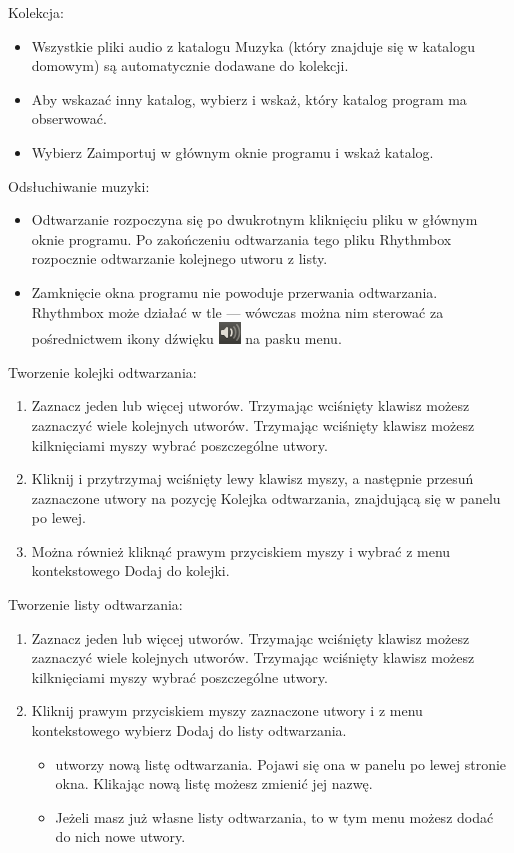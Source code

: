 Kolekcja:
\begin{itemize}
\item Wszystkie pliki audio z katalogu Muzyka (który znajduje się w katalogu domowym) są automatycznie dodawane do kolekcji.
\item Aby wskazać inny katalog, wybierz  i wskaż, który katalog program ma obserwować.
\item Wybierz \textcolor{ubuntu_orange}{Zaimportuj} w głównym oknie programu i wskaż katalog.
\end{itemize}
Odsłuchiwanie muzyki:
\begin{itemize}
\item Odtwarzanie rozpoczyna się po dwukrotnym kliknięciu pliku w głównym oknie programu. Po zakończeniu odtwarzania tego pliku Rhythmbox rozpocznie odtwarzanie kolejnego utworu z listy.
\item Zamknięcie okna programu nie powoduje przerwania odtwarzania. Rhythmbox może działać w tle --- wówczas można nim sterować za pośrednictwem ikony dźwięku \includegraphics{images/ikony_dzwiek.png} na pasku menu.
\end{itemize}
Tworzenie kolejki odtwarzania:
\begin{enumerate}
\item Zaznacz jeden lub więcej utworów. Trzymając wciśnięty klawisz  możesz zaznaczyć wiele kolejnych utworów. Trzymając wciśnięty klawisz  możesz kilknięciami myszy wybrać poszczególne utwory.
\item Kliknij i przytrzymaj wciśnięty lewy klawisz myszy, a następnie przesuń zaznaczone utwory na pozycję \textcolor{ubuntu_orange}{Kolejka odtwarzania}, znajdującą się w panelu po lewej.
\item Można również kliknąć prawym przyciskiem myszy i wybrać z menu kontekstowego \textcolor{ubuntu_orange}{Dodaj do kolejki}.
\end{enumerate}
Tworzenie listy odtwarzania:
\begin{enumerate}
\item Zaznacz jeden lub więcej utworów. Trzymając wciśnięty klawisz  możesz zaznaczyć wiele kolejnych utworów. Trzymając wciśnięty klawisz  możesz kilknięciami myszy wybrać poszczególne utwory.
\item  Kliknij prawym przyciskiem myszy zaznaczone utwory i z menu kontekstowego wybierz \textcolor{ubuntu_orange}{Dodaj do listy odtwarzania}.
\begin{itemize}
\item {} utworzy nową listę odtwarzania. Pojawi się ona w panelu po lewej stronie okna. Klikając nową listę możesz zmienić jej nazwę.
\item Jeżeli masz już własne listy odtwarzania, to w tym menu możesz dodać do nich nowe utwory.
\end{itemize}
\end{enumerate}
